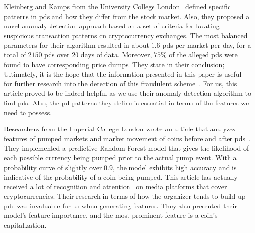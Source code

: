 Kleinberg and Kamps from the University College London~\cite{P&D_to_the_moon} defined specific patterns in \acp{pd} and how they differ from the stock market. Also, they proposed a novel anomaly detection approach based on a set of criteria for locating suspicious transaction patterns on cryptocurrency exchanges. The most balanced parameters for their algorithm resulted in about $1.6$ \acp{pd} per market per day, for a total of $2150$ \acp{pd} over $20$ days of data. Moreover, $75\%$ of the alleged \acp{pd} were found to have corresponding price dumps. They state in their conclusion; Ultimately, it is the hope that the information presented in this paper is useful for further research into the detection of this fraudulent scheme~\cite{P&D_to_the_moon}. For us, this article proved to be indeed helpful as we use their anomaly detection algorithm to find \acp{pd}. Also, the \ac{pd} patterns they define is essential in terms of the features we need to possess.

Researchers from the Imperial College London wrote an article that analyzes features of pumped markets and market movement of coins before and after \acp{pd}~\cite{P&D_anatomy}. They implemented a predictive Random Forest model that gives the likelihood of each possible currency being pumped prior to the actual pump event. With a probability curve of slightly over $0.9$, the model exhibits high accuracy and is indicative of the probability of a coin being pumped. This article has actually received a lot of recognition and attention~\cite{P&D_MIT_crypto, P&D_cointelegraph, P&D_UTB} on media platforms that cover cryptocurrencies. Their research in terms of how the organizer tends to build up \acp{pd} was invaluable for us when generating features. They also presented their model's feature importance, and the most prominent feature is a coin's capitalization.